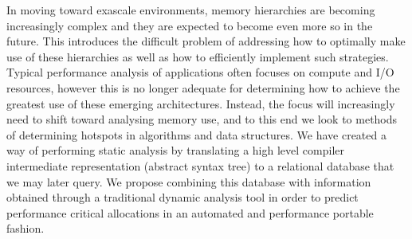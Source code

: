 In moving toward exascale environments, memory hierarchies are becoming increasingly complex and they are expected to become even more so in the future.
This introduces the difficult problem of addressing how to optimally make use of these hierarchies as well as how to efficiently implement such strategies.
Typical performance analysis of applications often focuses on compute and I/O resources, however this is no longer adequate for determining how to achieve the greatest use of these emerging architectures.
Instead, the focus will increasingly need to shift toward analysing memory use, and to this end we look to methods of determining hotspots in algorithms and data structures.
We have created a way of performing static analysis by translating a high level compiler intermediate representation (abstract syntax tree) to a relational database that we may later query.
We propose combining this database with information obtained through a traditional dynamic analysis tool in order to predict performance critical allocations in an automated and performance portable fashion.
